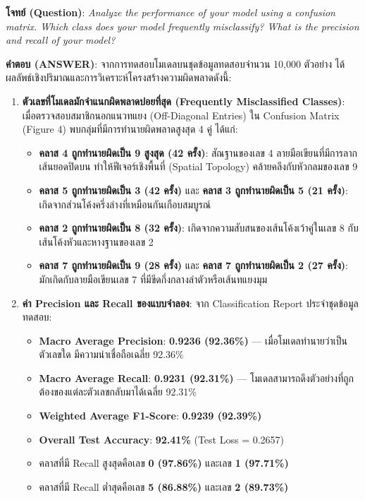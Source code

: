 \documentclass[12pt,a4paper]{article}
\begin{document}
\begin{ansbox}
\textbf{โจทย์ (Question)}: \textit{Analyze the performance of your model using a confusion matrix. Which class does your model frequently misclassify? What is the precision and recall of your model?}

\vspace{0.4em}
\textbf{คำตอบ (ANSWER)}:
จากการทดสอบโมเดลบนชุดข้อมูลทดสอบจำนวน 10,000 ตัวอย่าง ได้ผลลัพธ์เชิงปริมาณและการวิเคราะห์โครงสร้างความผิดพลาดดังนี้:

\begin{enumerate}[leftmargin=18pt, itemsep=3pt]
    \item \textbf{ตัวเลขที่โมเดลมักจำแนกผิดพลาดบ่อยที่สุด (Frequently Misclassified Classes)}:
    เมื่อตรวจสอบสมาชิกนอกแนวทแยง (Off-Diagonal Entries) ใน Confusion Matrix (Figure 4) พบกลุ่มที่มีการทำนายผิดพลาดสูงสุด 4 คู่ ได้แก่:
    \begin{itemize}
        \item \textbf{คลาส 4 ถูกทำนายผิดเป็น 9 สูงสุด (42 ครั้ง)}: สัณฐานของเลข 4 ลายมือเขียนที่มีการลากเส้นยอดปิดบน ทำให้ฟีเจอร์เชิงพื้นที่ (Spatial Topology) คล้ายคลึงกับหัวกลมของเลข 9
        \item \textbf{คลาส 5 ถูกทำนายผิดเป็น 3 (42 ครั้ง)} และ \textbf{คลาส 3 ถูกทำนายผิดเป็น 5 (21 ครั้ง)}: เกิดจากส่วนโค้งครึ่งล่างที่เหมือนกันเกือบสมบูรณ์
        \item \textbf{คลาส 2 ถูกทำนายผิดเป็น 8 (32 ครั้ง)}: เกิดจากความสับสนของเส้นโค้งเว้าคู่ในเลข 8 กับเส้นโค้งหัวและหางฐานของเลข 2
        \item \textbf{คลาส 7 ถูกทำนายผิดเป็น 9 (28 ครั้ง)} และ \textbf{คลาส 7 ถูกทำนายผิดเป็น 2 (27 ครั้ง)}: มักเกิดกับลายมือเขียนเลข 7 ที่มีขีดกึ่งกลางลำตัวหรือเส้นทแยงมุม
    \end{itemize}
    \item \textbf{ค่า Precision และ Recall ของแบบจำลอง}:
    จาก Classification Report ประจำชุดข้อมูลทดสอบ:
    \begin{itemize}
        \item \textbf{Macro Average Precision}: \textbf{0.9236 (92.36\%)} — เมื่อโมเดลทำนายว่าเป็นตัวเลขใด มีความน่าเชื่อถือเฉลี่ย 92.36\%
        \item \textbf{Macro Average Recall}: \textbf{0.9231 (92.31\%)} — โมเดลสามารถดึงตัวอย่างที่ถูกต้องของแต่ละตัวเลขกลับมาได้เฉลี่ย 92.31\%
        \item \textbf{Weighted Average F1-Score}: \textbf{0.9239 (92.39\%)}
        \item \textbf{Overall Test Accuracy}: \textbf{92.41\%} (Test Loss = 0.2657)
        \item คลาสที่มี Recall สูงสุดคือเลข \textbf{0 (97.86\%)} และเลข \textbf{1 (97.71\%)}
        \item คลาสที่มี Recall ต่ำสุดคือเลข \textbf{5 (86.88\%)} และเลข \textbf{2 (89.73\%)}
    \end{itemize}
\end{enumerate}
\end{ansbox}
\end{document}
